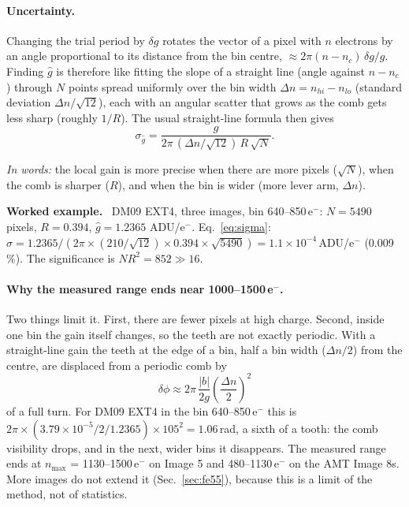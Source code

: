 \documentclass[11pt,a4paper]{article}
\newcommand{\eminus}{e$^-$}
\newcommand{\nmax}{n_{\mathrm{max}}}
\newenvironment{example}%
  {\par\smallskip\noindent\begin{lrbox}{\exbox}\begin{minipage}{0.96\linewidth}\small\textbf{Worked example.}\ }%
  {\end{minipage}\end{lrbox}\colorbox{black!6}{\usebox{\exbox}}\par\smallskip}
\newcommand{\inwords}[1]{\par\noindent\textit{In words:} #1\par}
\begin{document}
\paragraph{Uncertainty.} Changing the trial period by $\delta g$ rotates the vector of a pixel with
$n$ electrons by an angle proportional to its distance from the bin centre, $\approx 2\pi(n - n_c)\,
\delta g/g$. Finding $\hat g$ is therefore like fitting the slope of a straight line (angle against
$n - n_c$) through $N$ points spread uniformly over the bin width $\Delta n = n_{hi} - n_{lo}$
(standard deviation $\Delta n/\sqrt{12}$), each with an angular scatter that grows as the comb gets
less sharp (roughly $1/R$). The usual straight-line formula then gives
\begin{equation}
\sigma_{\hat g} = \frac{g}{2\pi\,(\Delta n/\sqrt{12})\,R\,\sqrt N} .
\label{eq:sigma}
\end{equation}
\inwords{the local gain is more precise when there are more pixels ($\sqrt N$), when the comb is
sharper ($R$), and when the bin is wider (more lever arm, $\Delta n$).}

\begin{example}
DM09 EXT4, three images, bin 640--850\,\eminus: $N = 5490$ pixels, $R = 0.394$, $\hat g = 1.2365$
ADU/\eminus. Eq.~\ref{eq:sigma}: $\sigma = 1.2365 / (2\pi \times (210/\sqrt{12}) \times 0.394 \times
\sqrt{5490}) = 1.1\times10^{-4}$\,ADU/\eminus{} (0.009\,\%). The significance is
$N R^2 = 852 \gg 16$.
\end{example}

\paragraph{Why the measured range ends near 1000--1500\,\eminus.} Two things limit it. First, there
are fewer pixels at high charge. Second, inside one bin the gain itself changes, so the teeth are not
exactly periodic. With a straight-line gain the teeth at the edge of a bin, half a bin width
($\Delta n/2$) from the centre, are displaced from a periodic comb by
\begin{equation}
\delta\phi \approx 2\pi\,\frac{|b|}{2g}\left(\frac{\Delta n}{2}\right)^2
\end{equation}
of a full turn. For DM09 EXT4 in the bin 640--850\,\eminus{} this is $2\pi \times (3.79\times10^{-5}/2/1.2365)
\times 105^2 = 1.06$\,rad, a sixth of a tooth: the comb visibility drops, and in the next, wider bins it
disappears. The measured range ends at $\nmax$ = 1130--1500\,\eminus{} on Image 5 and 480--1130\,\eminus{}
on the AMT Image 8s. More images do not extend it (Sec.~\ref{sec:fe55}), because this is a limit of the
method, not of statistics.
\end{document}
